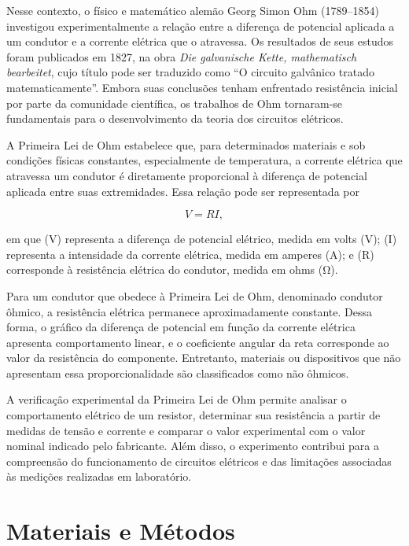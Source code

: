 \documentclass[a4paper,12pt]{article}
\begin{document}
Nesse contexto, o físico e matemático alemão Georg Simon Ohm (1789--1854) investigou experimentalmente a relação entre a diferença de potencial aplicada a um condutor e a corrente elétrica que o atravessa. Os resultados de seus estudos foram publicados em 1827, na obra \textit{Die galvanische Kette, mathematisch bearbeitet}, cujo título pode ser traduzido como ``O circuito galvânico tratado matematicamente''. Embora suas conclusões tenham enfrentado resistência inicial por parte da comunidade científica, os trabalhos de Ohm tornaram-se fundamentais para o desenvolvimento da teoria dos circuitos elétricos.

A Primeira Lei de Ohm estabelece que, para determinados materiais e sob condições físicas constantes, especialmente de temperatura, a corrente elétrica que atravessa um condutor é diretamente proporcional à diferença de potencial aplicada entre suas extremidades. Essa relação pode ser representada por

\begin{equation}
V = R I,
\label{eq:primeira_lei_ohm}
\end{equation}

em que (V) representa a diferença de potencial elétrico, medida em volts (\si{\volt}); (I) representa a intensidade da corrente elétrica, medida em amperes (\si{\ampere}); e (R) corresponde à resistência elétrica do condutor, medida em ohms (\si{\ohm}).

Para um condutor que obedece à Primeira Lei de Ohm, denominado condutor ôhmico, a resistência elétrica permanece aproximadamente constante. Dessa forma, o gráfico da diferença de potencial em função da corrente elétrica apresenta comportamento linear, e o coeficiente angular da reta corresponde ao valor da resistência do componente. Entretanto, materiais ou dispositivos que não apresentam essa proporcionalidade são classificados como não ôhmicos.

A verificação experimental da Primeira Lei de Ohm permite analisar o comportamento elétrico de um resistor, determinar sua resistência a partir de medidas de tensão e corrente e comparar o valor experimental com o valor nominal indicado pelo fabricante. Além disso, o experimento contribui para a compreensão do funcionamento de circuitos elétricos e das limitações associadas às medições realizadas em laboratório.


\section{Materiais e Métodos}
\end{document}
